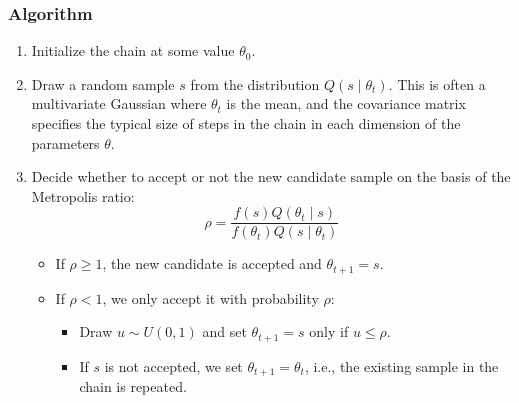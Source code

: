 \documentclass[
]{article}
\providecommand{\tightlist}{%
  \setlength{\itemsep}{0pt}\setlength{\parskip}{0pt}}
\begin{document}
\hypertarget{algorithm}{%
\subsubsection{Algorithm}\label{algorithm}}

\begin{enumerate}
\def\labelenumi{\arabic{enumi}.}
\tightlist
\item
  Initialize the chain at some value \(\theta_0\).
\item
  Draw a random sample \(s\) from the distribution
  \(Q(s \mid \theta_t)\). This is often a multivariate Gaussian where
  \(\theta_t\) is the mean, and the covariance matrix specifies the
  typical size of steps in the chain in each dimension of the parameters
  \(\theta\).
\item
  Decide whether to accept or not the new candidate sample on the basis
  of the Metropolis ratio: \[
  \rho = \frac{f(s) Q(\theta_t \mid s)}{f(\theta_t) Q(s \mid \theta_t)}
  \]

  \begin{itemize}
  \tightlist
  \item
    If \(\rho \geq 1\), the new candidate is accepted and
    \(\theta_{t+1} = s\).
  \item
    If \(\rho < 1\), we only accept it with probability \(\rho\):

    \begin{itemize}
    \tightlist
    \item
      Draw \(u \sim U(0, 1)\) and set \(\theta_{t+1} = s\) only if
      \(u \leq \rho\).
    \item
      If \(s\) is not accepted, we set \(\theta_{t+1} = \theta_t\),
      i.e., the existing sample in the chain is repeated.
    \end{itemize}
  \end{itemize}
\end{enumerate}
\end{document}
